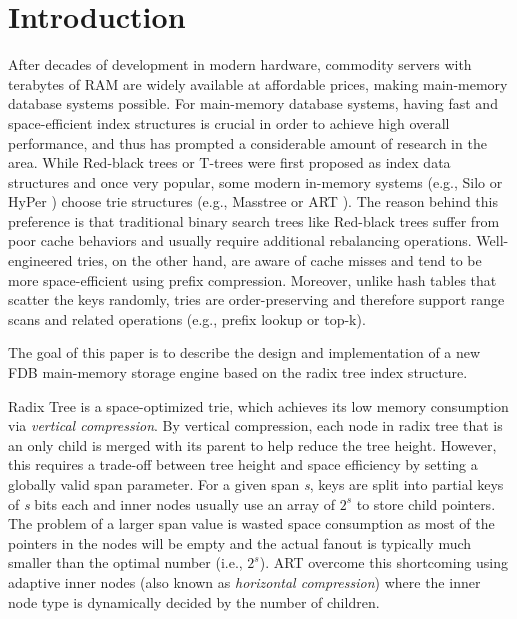 \documentclass[sigplan,screen,nonacm]{acmart}
\begin{document}
\maketitle

\section{Introduction}
\label{sec:intro}
After decades of development in modern hardware, commodity servers with terabytes of RAM are widely available at affordable prices, making main-memory database systems possible. For main-memory database systems, having fast and space-efficient index structures is crucial in order to achieve high overall performance, and thus has prompted a considerable amount of research in the area. While Red-black trees \cite{bayer1972symmetric} or T-trees \cite{lehman1985study} were first proposed as index data structures and once very popular, some modern in-memory systems (e.g., Silo \cite{tu2013speedy} or HyPer \cite{kemper2011hyper}) choose trie structures (e.g., Masstree \cite{mao2012cache} or ART \cite{leis2013adaptive}). The reason behind this preference is that traditional binary search trees like Red-black trees suffer from poor cache behaviors \cite{rao1998cache} and usually require additional rebalancing operations. Well-engineered tries, on the other hand, are aware of cache misses and tend to be more space-efficient using prefix compression. Moreover, unlike hash tables that scatter the keys randomly, tries are order-preserving and therefore support range scans and related operations (e.g., prefix lookup or top-k).

The goal of this paper is to describe the design and implementation of a new FDB main-memory storage engine based on the radix tree index structure. 

Radix Tree is a space-optimized trie, which achieves its low memory consumption via {\itshape vertical compression}. By vertical compression, each node in radix tree that is an only child is merged with its parent to help reduce the tree height. However, this requires a trade-off between tree height and space efficiency by setting a globally valid span parameter. For a given span {\itshape s}, keys are split into partial keys of {\itshape s} bits each and inner nodes usually use an array of $2^{s}$ to store child pointers. The problem of a larger span value is wasted space consumption as most of the pointers in the nodes will be empty and the actual fanout is typically much smaller than the optimal number (i.e., $2^{s}$). ART \cite{leis2013adaptive} overcome this shortcoming using adaptive inner nodes (also known as {\itshape horizontal compression}) where the inner node type is dynamically decided by the number of children. 
\end{document}
